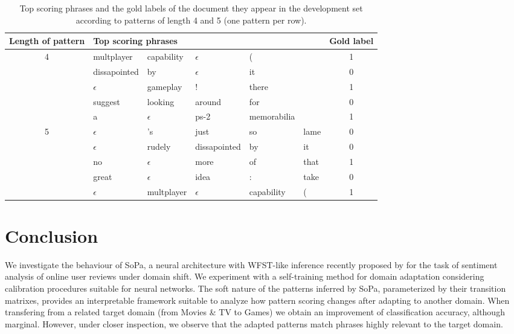 \documentclass[11pt,a4paper]{article}
\begin{document}
\begin{table*}[]
\centering
\begin{tabular}{|c|lllll|c|}
\hline
Length of pattern & \multicolumn{5}{l|}{Top scoring phrases}                      & Gold label \\ \hline
4                 & multplayer   & capability & $\epsilon$   & (           &      & 1          \\
                  & dissapointed & by         & $\epsilon$   & it          &      & 0          \\
                  & $\epsilon$   & gameplay   & !            & there       &      & 1          \\
                  & suggest      & looking    & around       & for         &      & 0          \\
                  & a            & $\epsilon$ & ps-2         & memorabilia &      & 1          \\ \hline
5                 & $\epsilon$   & 's         & just         & so          & lame & 0          \\
                  & $\epsilon$   & rudely     & dissapointed & by          & it   & 0          \\
                  & no           & $\epsilon$ & more         & of          & that & 1          \\
                  & great        & $\epsilon$ & idea         & :           & take & 0          \\
                  & $\epsilon$   & multplayer & $\epsilon$   & capability  & (    & 1          \\ \hline
\end{tabular}
\caption{Top scoring phrases and the gold labels of the document they appear in the development set according to patterns of length 4 and 5 (one pattern per row).}
\label{table:top-phrases}
\end{table*}


\section{Conclusion}

We investigate the behaviour of {\sc SoPa}, a neural architecture with WFST-like inference recently proposed by \citet{schwartz2018sopa} for the task of sentiment analysis of online user reviews under domain shift. We experiment with a self-training method for domain adaptation considering calibration procedures suitable for neural networks.
The soft nature of the patterns inferred by {\sc SoPa}, parameterized by their transition matrixes, provides an interpretable framework suitable to analyze how pattern scoring changes after adapting to another domain.
When transfering from a related target domain (from Movies \& TV to Games) we obtain an improvement of classification accuracy, although marginal. However, under closer inspection, we observe that the adapted patterns match phrases highly relevant to the target domain.




\end{document}
